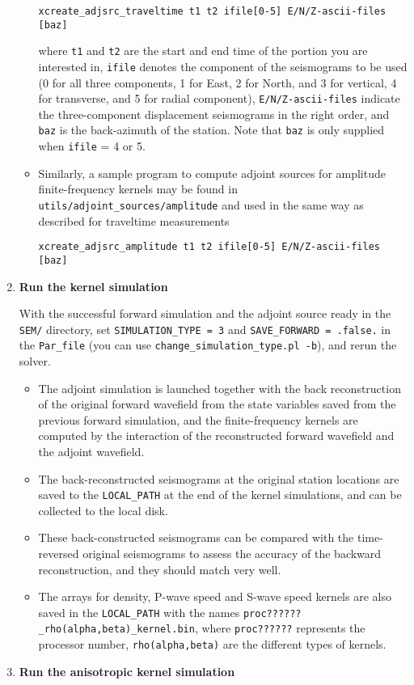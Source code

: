 \begin{enumerate}
\begin{itemize}
\begin{verbatim}
xcreate_adjsrc_traveltime t1 t2 ifile[0-5] E/N/Z-ascii-files [baz]
\end{verbatim}
where \texttt{t1} and \texttt{t2} are the start and end time of the
portion you are interested in, \texttt{ifile} denotes the component
of the seismograms to be used (0 for all three components, 1 for East,
2 for North, and 3 for vertical, 4 for transverse, and 5 for radial
component), \texttt{E/N/Z-ascii-files} indicate the three-component
displacement seismograms in the right order, and \texttt{baz} is the
back-azimuth of the station. Note that \texttt{baz} is only supplied
when \texttt{ifile} = 4 or 5.

\item Similarly, a sample program to compute adjoint sources for amplitude
finite-frequency kernels may be found in \texttt{utils/adjoint\_sources/amplitude}
and used in the same way as described for traveltime measurements
\begin{verbatim}
xcreate_adjsrc_amplitude t1 t2 ifile[0-5] E/N/Z-ascii-files [baz]
\end{verbatim}
\end{itemize}
\item \textbf{Run the kernel simulation}


With the successful forward simulation and the adjoint source ready
in the \texttt{SEM/} directory, set \texttt{SIMULATION\_TYPE
= 3} and \texttt{SAVE\_FORWARD = .false.} in the \texttt{Par\_file}
(you can use \texttt{change\_simulation\_type.pl -b}), and rerun the
solver.
\begin{itemize}
\item The adjoint simulation is launched together with the back reconstruction
of the original forward wavefield from the state variables saved from
the previous forward simulation, and the finite-frequency kernels
are computed by the interaction of the reconstructed forward wavefield
and the adjoint wavefield.
\item The back-reconstructed seismograms at the original station locations
are saved to the \texttt{LOCAL\_PATH} at the end of the kernel simulations,
and can be collected to the local disk.
\item These back-constructed seismograms can be compared with the time-reversed
original seismograms to assess the accuracy of the backward reconstruction,
and they should match very well.
\item The arrays for density, P-wave speed and S-wave speed kernels are
also saved in the \texttt{LOCAL\_PATH} with the names \texttt{proc??????\_rho(alpha,beta)\_kernel.bin},
where \texttt{proc??????} represents the processor number, \texttt{rho(alpha,beta)}
are the different types of kernels.
\end{itemize}
\item \textbf{Run the anisotropic kernel simulation}



\end{enumerate}
